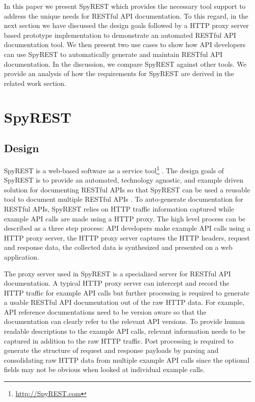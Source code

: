 In this paper we present SpyREST which provides the necessary tool support to address the unique needs for RESTful API documentation. To this regard, in the next section we have discussed the design goals followed by a HTTP proxy server based prototype implementation to demonstrate an automated RESTful API documentation tool. We then present two use cases to show how API developers can use SpyREST to automatically generate and maintain RESTful API documentation. In the discussion, we compare SpyREST against other tools. We provide an analysis of how the requirements for SpyREST are derived in the related work section.

\section{SpyREST}

\subsection{Design} %
\label{sub:how_it_works}

SpyREST is a web-based software as a service tool\footnote{\url{http://SpyREST.com}} \cite{Sohan_spyrest}. The design goals of SpyREST is to provide an automated, technology agnostic, and example driven solution for documenting RESTful APIs so that SpyREST can be used a reusable tool to document multiple RESTful APIs . To auto-generate documentation for RESTful APIs, SpyREST relies on HTTP traffic information captured while example API calls are made using a HTTP proxy. The high level process can be described as a three step process: API developers make example API calls using a HTTP proxy server, the HTTP proxy server captures the HTTP headers, request and response data, the collected data is synthesized and presented on a web application.

The proxy server used in SpyREST is a specialized server for RESTful API documentation. A typical HTTP proxy server can intercept and record the HTTP traffic for example API calls but further processing is required to generate a usable RESTful API documentation out of the raw HTTP data. For example, API reference documentations need to be version aware so that the documentation can clearly refer to the relevant API versions. To provide human readable descriptions to the example API calls, relevant information needs to be captured in addition to the raw HTTP traffic. Post processing is required to generate the structure of request and response payloads by parsing and consolidating raw HTTP data from multiple example API calls since the optional fields may not be obvious when looked at individual example calls.

